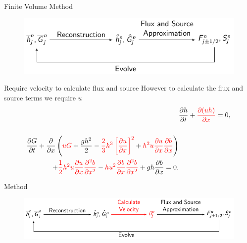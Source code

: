 \documentclass[pdf]{beamer}
\begin{document}
\begin{frame}{Finite Volume Method}
	\begin{figure}
		\includegraphics[width=\textwidth]{./Pics/Tex/FlowCharts/FVM.pdf}
	\end{figure}
\end{frame}

\begin{frame}{Require velocity to calculate flux and source}
	However to calculate the flux and source terms we require $u$
	\pause	
	\begin{align*}
	& \frac{\partial h}{\partial t} + {\color{red}\dfrac{\partial (uh)}{\partial x}} = 0,  \\ \nonumber \\
	\begin{split}
	\frac{\partial G}{\partial t}  + \frac{\partial}{\partial x} \left( {\color{red}uG} + \frac{gh^2}{2} - {\color{red}\frac{2}{3}h^3 \left[\frac{\partial {u}}{\partial x}\right]^2} + {\color{red}h^2 {u}\frac{\partial {u}}{\partial x}\frac{\partial b}{\partial x} }\right) \\ + {\color{red}\frac{1}{2}h^2 {u} \frac{\partial {u}}{\partial x} \frac{\partial^2 b}{\partial x^2} } -  {\color{red} h {u}^2\frac{\partial b}{\partial x}\frac{\partial^2 b}{\partial x^2}} + gh\frac{\partial b}{\partial x} = 0 .
	\end{split}
	\end{align*}
\end{frame}

\begin{frame}{Method}
	\begin{figure}
		\includegraphics[width=1\textwidth]{./Pics/Tex/FlowCharts/FEVM.pdf}
	\end{figure}
\end{frame}
\end{document}
